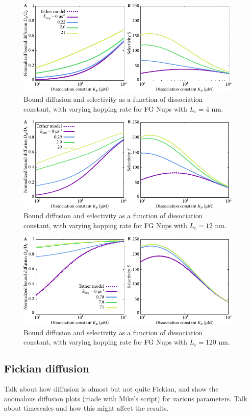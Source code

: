 \begin{figure}[h]
\centering
\includegraphics[width=0.7\linewidth]{figs/ch02/hopping_lc4-fig.pdf}
\caption{Bound diffusion and selectivity as a function of dissociation
  constant, with varying hopping rate for FG Nups with $L_c = 4$ nm.}
\label{fig:partitioningB}
\end{figure}
\begin{figure}[h]
\centering
\includegraphics[width=0.7\linewidth]{figs/ch02/hopping_lc12-fig.pdf}
\caption{Bound diffusion and selectivity as a function of dissociation
  constant, with varying hopping rate for FG Nups with $L_c = 12$ nm.}
\label{fig:partitioningC}
\end{figure}
\begin{figure}[h]
\centering
\includegraphics[width=0.7\linewidth]{figs/ch02/hopping_lc120-fig.pdf}
\caption{Bound diffusion and selectivity as a function of dissociation
  constant, with varying hopping rate for FG Nups with $L_c = 120$ nm.}
\label{fig:partitioningD}
\end{figure}

\subsection{Fickian diffusion}
Talk about how diffusion is almost but not quite Fickian, and show the anomalous diffusion plots (made with Mike's script) for various parameters. Talk about timescales and how this might affect the results.


